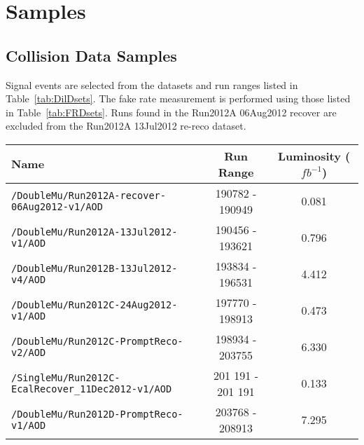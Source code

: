 \chapter{Samples}
\label{ch:samples}
\section{Collision Data Samples}
	
	
Signal events are selected from the datasets and run ranges listed in Table~\ref{tab:DilDsets}.  The fake rate measurement is performed using those listed in Table~\ref{tab:FRDsets}.  Runs found in the Run2012A 06Aug2012 recover are excluded from the Run2012A 13Jul2012 re-reco dataset. 

\begin{table}[hbt]
\begin{center}
\begin{tabular}{lcc}\hline\hline
Name		& Run Range & Luminosity ($fb^{-1}$) \\ \hline
\verb=/DoubleMu/Run2012A-recover-06Aug2012-v1/AOD=                 & 190782 - 190949 &  0.081 \\ 
\verb=/DoubleMu/Run2012A-13Jul2012-v1/AOD=                                  &  190456 - 193621       & 0.796               \\ 
\verb=/DoubleMu/Run2012B-13Jul2012-v4/AOD=                                  &  193834 - 196531        & 4.412             \\ 
\verb=/DoubleMu/Run2012C-24Aug2012-v1/AOD=                                &  197770 - 198913  & 0.473\\  
\verb=/DoubleMu/Run2012C-PromptReco-v2/AOD=                               &  198934 - 203755     & 6.330                \\ 
\verb=/SingleMu/Run2012C-EcalRecover_11Dec2012-v1/AOD=          & 201 191 - 201 191 & 0.133\\
\verb=/DoubleMu/Run2012D-PromptReco-v1/AOD=                               &  203768 - 208913  &  7.295 \\


\end{tabular}
\end{center}
\end{table}
